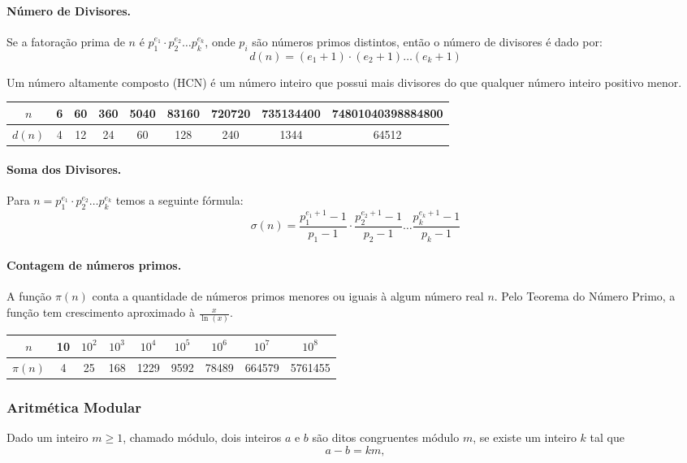 \paragraph{Número de Divisores.} Se a fatoração prima de $n$ é $p_1^{e_1}\cdot p_2^{e_2}\dots  p_k^{e_k}$, onde $p_i$ são números primos distintos, então o número de divisores é dado por:
$$d(n) = (e_1+1)\cdot(e_2+1) \dots (e_k+1)$$

Um número altamente composto (HCN) é um número inteiro que possui mais divisores do que qualquer número inteiro positivo menor.

\begin{center}
    \begin{tabular}{c|c|c|c|c|c|c|c|c}
        $n$ & 6 & 60&360&5040&83160&720720&735134400&74801040398884800 \\
        \hline
        $d(n)$ & 4&12&24&60&128&240&1344&64512
    \end{tabular}
\end{center}

\paragraph{Soma dos Divisores.} Para $n = p_1^{e_1}\cdot p_2^{e_2}\dots p_k^{e_k}$ temos a seguinte fórmula:
$$\sigma(n) = \frac{p_1^{e_1+1}-1}{p_1-1} \cdot \frac{p_2^{e_2+1}-1}{p_2-1}  \dots  \frac{p_k^{e_k+1}-1}{p_k-1}$$

\paragraph{Contagem de números primos.} A função $\pi(n)$ conta a quantidade de números primos menores ou iguais à algum número real $n$. Pelo Teorema do Número Primo, a função tem crescimento aproximado à $\frac{x}{\ln(x)}$.

\begin{center}
    \begin{tabular}{c|c|c|c|c|c|c|c|c}
        $n$ &10&$10^2$&$10^3$&$10^4$&$10^5$&$10^6$&$10^7$&$10^8$ \\
        \hline
        $\pi(n)$ &4&25&168&1229&9592&78489&664579&5761455
        
    \end{tabular}
\end{center}

\subsubsection{Aritmética Modular}
Dado um inteiro $m \ge 1$, chamado módulo, dois inteiros $a$ e $b$ são ditos congruentes módulo $m$, se existe um inteiro $k$ tal que
$$a-b = km,$$

